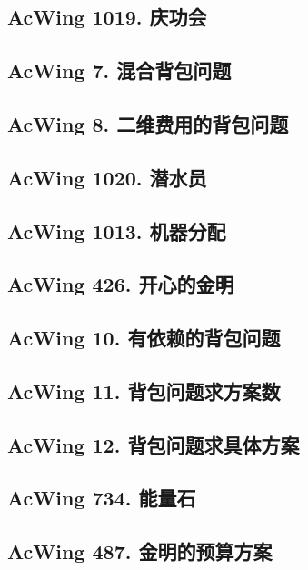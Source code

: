 \subsection{AcWing 1019. 庆功会}

\subsection{AcWing 7. 混合背包问题}

\subsection{AcWing 8. 二维费用的背包问题}

\subsection{AcWing 1020. 潜水员}

\subsection{AcWing 1013. 机器分配}

\subsection{AcWing 426. 开心的金明}

\subsection{AcWing 10. 有依赖的背包问题}

\subsection{AcWing 11. 背包问题求方案数}

\subsection{AcWing 12. 背包问题求具体方案}

\subsection{AcWing 734. 能量石}

\subsection{AcWing 487. 金明的预算方案}


